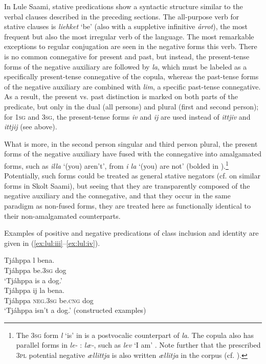 \documentclass[output=paper,colorlinks,citecolor=brown]{langscibook}
\begin{document}
In Lule Saami, stative predications show a syntactic structure similar to the verbal clauses described in the preceding sections. The all-purpose verb for stative clauses is \textit{liehket} ‘be’ (also with a suppletive infinitive \textit{årrot}), the most frequent but also the most irregular verb of the language. The most remarkable exceptions to regular conjugation are seen in the negative forms this verb. There is no common connegative for present and past, but instead, the present-tense forms of the negative auxiliary are followed by \textit{la}, which must be labeled as a specifically present-tense connegative of the copula, whereas the past-tense forms of the negative auxiliary are combined with \textit{lim}, a specific past-tense connegative. As a result, the present vs. past distinction is marked on both parts of the predicate, but only in the dual (all persons) and plural (first and second person); for \textsc{1sg} and \textsc{3sg}, the present-tense forms \textit{iv} and \textit{ij} are used instead of \textit{ittjiv} and \textit{ittjij} (see  above).

What is more, in the second person singular and third person plural, the present forms of the negative auxiliary have fused with the connegative into amalgamated forms, such as \textit{illa} ‘(you) aren’t’, from \textit{i la} ‘(you) are not’ (bolded in ).\footnote{The \textsc{3sg} form \textit{l} ‘is’ in  is a postvocalic counterpart of \textit{la}. The copula also has parallel forms in \textit{le-} : \textit{læ-}, such as \textit{lev} ‘I am’ \citep[70]{Spiik1989}. Note further that the prescribed \textsc{3pl} potential negative \textit{ællittja} is also written \textit{ællitja} in the corpus (cf. \citealt[218]{Ylikoski2016b}).} Potentially, such forms could be treated as general stative negators (cf. \citealt[362–363]{MiestamoKoponen2015} on similar forms in Skolt Saami), but seeing that they are transparently composed of the negative auxiliary and the connegative, and that they occur in the same paradigm as non-fused forms, they are treated here as functionally identical to their non-amalgamated counterparts.

Examples of positive and negative predications of class inclusion and identity are given in (\ref{ex:lul:iii}--\ref{ex:lul:iv}).

\ea\label{ex:lul:iii}
    \ea
    \gll Tjáhppa l bena.\\
        Tjáhppa be.\textsc{3sg} dog\\
    \glt ‘Tjáhppa is a dog.’\\
    \ex 
    \gll Tjáhppa ij la bena. \\
        Tjáhppa \textsc{neg.3sg} be.\textsc{cng} dog\\
    \glt ‘Tjáhppa isn’t a dog.’ (constructed examples)
\z \z 
\end{document}

